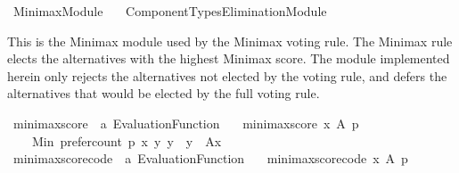 %
\begin{isabellebody}%
%
%
\isadelimdocument
\isanewline
%
\endisadelimdocument
%
\isatagdocument
\isanewline
%
\isamarkuptrue%
%
\endisatagdocument
{\isafolddocument}%
%
\isadelimdocument
%
\endisadelimdocument
%
\isadelimtheory
%
\endisadelimtheory
%
\isatagtheory
{}\isamarkupfalse%
\ Minimax{\isacharunderscore}{\kern0pt}Module\isanewline
\ \ \ {\isachardoublequoteopen}Component{\isacharunderscore}{\kern0pt}Types{\isacharslash}{\kern0pt}Elimination{\isacharunderscore}{\kern0pt}Module{\isachardoublequoteclose}\isanewline
{}%
\endisatagtheory
{\isafoldtheory}%
%
\isadelimtheory
%
\endisadelimtheory
%
\begin{isamarkuptext}%
This is the Minimax module used by the Minimax voting rule. The Minimax rule
elects the alternatives with the highest Minimax score. The module implemented
herein only rejects the alternatives not elected by the voting rule, and defers
the alternatives that would be elected by the full voting rule.%
\end{isamarkuptext}\isamarkuptrue%
%
\isadelimdocument
%
\endisadelimdocument
%
\isatagdocument
%
\isamarkuptrue%
%
\endisatagdocument
{\isafolddocument}%
%
\isadelimdocument
%
\endisadelimdocument
{}\isamarkupfalse%
\ minimax{\isacharunderscore}{\kern0pt}score\ {\isacharcolon}{\kern0pt}{\isacharcolon}{\kern0pt}\ {\isachardoublequoteopen}{\isacharprime}{\kern0pt}a\ Evaluation{\isacharunderscore}{\kern0pt}Function{\isachardoublequoteclose}\ \isanewline
\ \ {\isachardoublequoteopen}minimax{\isacharunderscore}{\kern0pt}score\ x\ A\ p\ {\isacharequal}{\kern0pt}\isanewline
\ \ \ \ Min\ {\isacharbraceleft}{\kern0pt}prefer{\isacharunderscore}{\kern0pt}count\ p\ x\ y\ {\isacharbar}{\kern0pt}y\ {\isachardot}{\kern0pt}\ y\ {\isasymin}\ A{\isacharminus}{\kern0pt}{\isacharbraceleft}{\kern0pt}x{\isacharbraceright}{\kern0pt}{\isacharbraceright}{\kern0pt}{\isachardoublequoteclose}\isanewline
\isanewline
{}\isamarkupfalse%
\ minimax{\isacharunderscore}{\kern0pt}score{\isacharunderscore}{\kern0pt}code\ {\isacharcolon}{\kern0pt}{\isacharcolon}{\kern0pt}\ {\isachardoublequoteopen}{\isacharprime}{\kern0pt}a\ Evaluation{\isacharunderscore}{\kern0pt}Function{\isachardoublequoteclose}\ \isanewline
\ \ {\isachardoublequoteopen}minimax{\isacharunderscore}{\kern0pt}score{\isacharunderscore}{\kern0pt}code\ x\ A\ p\ {\isacharequal}{\kern0pt}\isanewline

\end{isabellebody}
